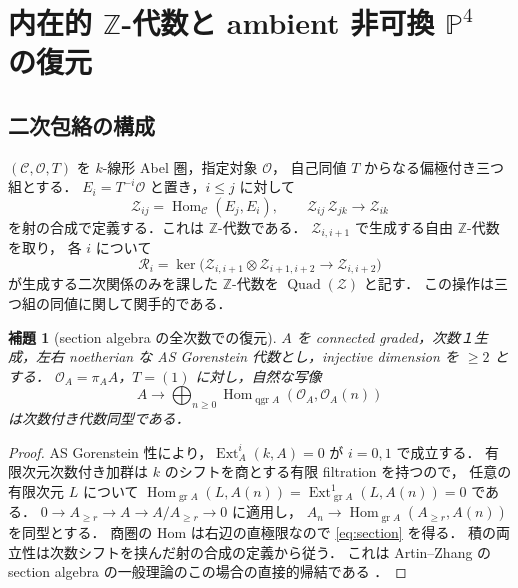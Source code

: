 \documentclass[11pt,a4paper]{ltjsarticle}
\numberwithin{equation}{section}
\newtheorem{lemma}[theorem]{補題}
\newcommand{\PP}{\mathbb P}
\newcommand{\OO}{\mathcal O}
\newcommand{\cZ}{\mathcal Z}
\newcommand{\qgr}{\operatorname{qgr}}
\newcommand{\Hom}{\operatorname{Hom}}
\newcommand{\Ext}{\operatorname{Ext}}
\begin{document}
\section{内在的 $\mathbb Z$-代数と ambient 非可換 $\PP^4$ の復元}\label{sec:reconstruction}
\subsection{二次包絡の構成}
$(\mathcal C,\OO,T)$ を $k$-線形 Abel 圏，指定対象 $\OO$，
自己同値 $T$ からなる偏極付き三つ組とする．
$E_i=T^{-i}\OO$ と置き，$i\le j$ に対して
\begin{equation}\label{eq:Zalg}
 \cZ_{ij}=\Hom_{\mathcal C}(E_j,E_i),\qquad
 \cZ_{ij}\,\cZ_{jk}\longrightarrow\cZ_{ik}
\end{equation}
を射の合成で定義する．これは $\mathbb Z$-代数である．
$\cZ_{i,i+1}$ で生成する自由 $\mathbb Z$-代数を取り，
各 $i$ について
\begin{equation}\label{eq:rel2}
 \mathcal R_i=
 \ker\bigl(\cZ_{i,i+1}\otimes\cZ_{i+1,i+2}
 \longrightarrow\cZ_{i,i+2}\bigr)
\end{equation}
が生成する二次関係のみを課した $\mathbb Z$-代数を
$\operatorname{Quad}(\cZ)$ と記す．
この操作は三つ組の同値に関して関手的である．

\begin{lemma}[section algebra の全次数での復元]\label{lem:section}
$A$ を connected graded，次数１生成，左右 noetherian な
AS Gorenstein 代数とし，injective dimension を $\ge2$ とする．
$\OO_A=\pi_A A$，$T=(1)$ に対し，自然な写像
\begin{equation}\label{eq:section}
 A\longrightarrow \bigoplus_{n\ge0}
 \Hom_{\qgr A}(\OO_A,\OO_A(n))
\end{equation}
は次数付き代数同型である．
\end{lemma}
\begin{proof}
AS Gorenstein 性により，$\Ext_A^i(k,A)=0$ が $i=0,1$ で成立する．
有限次元次数付き加群は $k$ のシフトを商とする有限 filtration を持つので，
任意の有限次元 $L$ について
$\Hom_{\operatorname{gr} A}(L,A(n))=
\Ext^1_{\operatorname{gr} A}(L,A(n))=0$ である．
$0\to A_{\ge r}\to A\to A/A_{\ge r}\to0$ に適用し，
$A_n\to\Hom_{\operatorname{gr}A}(A_{\ge r},A(n))$ を同型とする．
商圏の Hom は右辺の直極限なので \eqref{eq:section} を得る．
積の両立性は次数シフトを挟んだ射の合成の定義から従う．
これは Artin--Zhang の section algebra の一般理論のこの場合の直接的帰結である
\cite{AZ,YZ}．
\end{proof}
\end{document}
